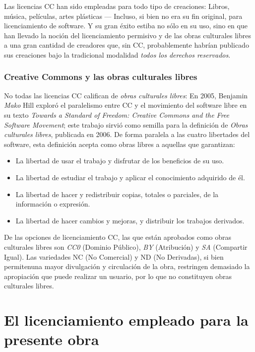 \documentclass[11pt,fleqn]{book} %
\begin{document}
Las licencias \textsc{CC} han sido empleadas para todo tipo de
creaciones: Libros, música, películas, artes plásticas — Incluso, si
bien no era su fin original, para licenciamiento de software. Y su
gran éxito estiba no sólo en su uso, sino en que han llevado la noción
del licenciamiento permisivo y de las obras culturales libres a una
gran cantidad de creadores que, sin \textsc{CC}, probablemente habrían
publicado sus creaciones bajo la tradicional modalidad \emph{todos los derechos reservados}.
\subsubsection{Creative Commons y las obras culturales libres}
\label{sec-8-2-1-1}


No todas las licencias \textsc{CC} califican de \emph{obras culturales libres}: En 2005, Benjamin \emph{Mako} Hill exploró el paralelismo entre
\textsc{CC} y el movimiento del software libre en su texto \emph{Towards a Standard of Freedom: Creative Commons and the Free Software Movement};
este trabajo sirvió como semilla para la definición de \emph{Obras culturales libres}, publicada en 2006. De forma paralela a las cuatro
libertades del software, esta definición acepta como obras libres a
aquellas que garantizan:

\begin{itemize}
\item La libertad de usar el trabajo y disfrutar de los beneficios de su
  uso.
\item La libertad de estudiar el trabajo y aplicar el conocimiento
  adquirido de él.
\item La libertad de hacer y redistribuir copias, totales o parciales, de
  la información o expresión.
\item La libertad de hacer cambios y mejoras, y distribuir los trabajos
  derivados.
\end{itemize}

De las opciones de licenciamiento \textsc{CC}, las que están aprobados
como obras culturales libres son \emph{CC0} (Dominio Público), \emph{BY}
(Atribución) y \emph{SA} (Compartir Igual). Las variedades NC (No
Comercial) y ND (No Derivadas), si bien permitenuna mayor divulgación
y circulación de la obra, restringen demasiado la apropiación que
puede realizar un usuario, por lo que no constituyen obras culturales
libres.
\section{El licenciamiento empleado para la presente obra}
\label{sec-8-3}
\end{document}
